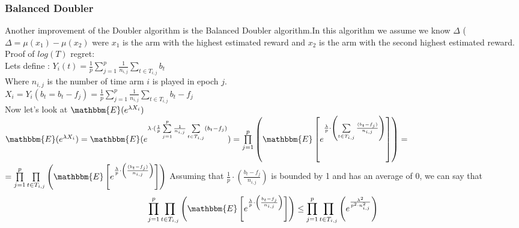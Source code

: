 \documentclass{llncs}
\begin{document}
		
		
		\newpage	
	\subsubsection{Balanced Doubler}
		Another improvement of the Doubler algorithm is the Balanced Doubler algorithm.In this algorithm we assume we know $\Delta$ ($\Delta = \mu(x_1) - \mu(x_2)$ were $x_1$ is the arm with the highest estimated reward and $x_2$ is the arm with the second highest estimated reward.
		\\
		Proof of $log(T)$ regret:
		\\
		Lets define : $Y_i(t) = \frac{1}{p}\sum\limits_{j=1}^{p}\frac{1}{n_{i,j}}
						   \sum\limits_{t\in T_{i,j}} b_t$		
		\\
		Where $n_{i,j}$ is the number of time arm $i$ is played in epoch $j$.\\
		$X_i = Y_i (b_t = b_t- f_j) =   \frac{1}{p}\sum\limits_{j=1}^{p}\frac{1}{n_{i,j}}
						   \sum\limits_{t\in T_{i,j}} b_t-f_j$	
		\\
		Now let's look at $\mathbbm{E}(e^{\lambda X_i})$
		\\	
		$\mathbbm{E}(e^{\lambda X_i}) = \mathbbm{E}(e^{\lambda\cdot(
		\frac{1}{p}\sum\limits_{j=1}^{p}\frac{1}{n_{i,j}}
						   \sum\limits_{t\in T_{i,j}}( b_t-f_j
						   )}) =						      	   
						   \prod\limits_{j=1}^{p}
						   \left(
						   \mathbbm{E}\left[e^{\frac{\lambda}{p}\cdot\left(
						   	   \sum\limits_{t\in T_{i,j}}
						   	   		\frac{(b_t-f_j)}{n_{i,j}}
						\right)}\right]
						   \right)=
						   $		
						   \\
						   $ =						      	   
						   \prod\limits_{j=1}^{p}
						   \prod\limits_{t\in T_{i,j}}
						   \left(
						   \mathbbm{E}\left[e^{\frac{\lambda}
						   {p}\cdot\left(
						   	   		\frac{(b_t-f_j)}
						   	   		{n_{i,j}}\right)}
						   	   		\right]
						   \right)$
		Assuming that $\frac{1}{p}\cdot\left(\frac{b_t-f_j}
		{n_{i,j}}\right) $ is bounded by 1 and has an average of 0, we can say that
		\\
		$$ \prod\limits_{j=1}^{p}
						   \prod\limits_{t\in T_{i,j}}
						   \left(
						   \mathbbm{E}\left[e^{\frac{\lambda}
						   {p}\cdot\left(
						   	   		\frac{b_t-f_j}
						   	   		{n_{i,j}}\right)}
						   	   		\right]
						   \right) \leq
						   \prod\limits_{j=1}^{p}
						   \prod\limits_{t\in T_{i,j}}
						   \left(
						   e^{\frac{\lambda^2}{p^2\cdot n^2_{i,j}}}
						   \right)
						   $$
						   
\end{document}
